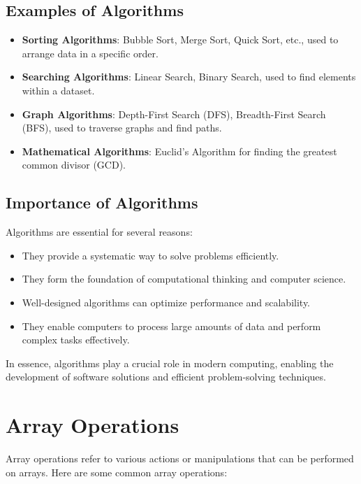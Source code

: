 \documentclass{article}
\begin{document}
\subsection{Examples of Algorithms}

\begin{itemize}
    \item \textbf{Sorting Algorithms}: Bubble Sort, Merge Sort, Quick Sort, etc., used to arrange data in a specific order.
    \item \textbf{Searching Algorithms}: Linear Search, Binary Search, used to find elements within a dataset.
    \item \textbf{Graph Algorithms}: Depth-First Search (DFS), Breadth-First Search (BFS), used to traverse graphs and find paths.
    \item \textbf{Mathematical Algorithms}: Euclid's Algorithm for finding the greatest common divisor (GCD).
\end{itemize}

\subsection{Importance of Algorithms}

Algorithms are essential for several reasons:

\begin{itemize}
    \item They provide a systematic way to solve problems efficiently.
    \item They form the foundation of computational thinking and computer science.
    \item Well-designed algorithms can optimize performance and scalability.
    \item They enable computers to process large amounts of data and perform complex tasks effectively.
\end{itemize}

In essence, algorithms play a crucial role in modern computing, enabling the development of software solutions and efficient problem-solving techniques.
\section*{Array Operations}

Array operations refer to various actions or manipulations that can be performed on arrays. Here are some common array operations:
\end{document}
